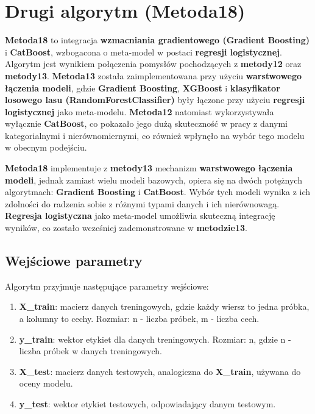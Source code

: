 \section{Drugi algorytm (\textbf{Metoda18})}
\textbf{Metoda18} to integracja \textbf{wzmacniania gradientowego (Gradient Boosting)} i \textbf{CatBoost}, wzbogacona o meta-model w postaci \textbf{regresji logistycznej}. Algorytm jest wynikiem połączenia pomysłów pochodzących z \textbf{metody12} oraz \textbf{metody13}. \textbf{Metoda13} została zaimplementowana przy użyciu \textbf{warstwowego łączenia modeli}, gdzie \textbf{Gradient Boosting}, \textbf{XGBoost} i \textbf{klasyfikator losowego lasu (RandomForestClassifier)} były łączone przy użyciu \textbf{regresji logistycznej} jako meta-modelu. \textbf{Metoda12} natomiast wykorzystywała wyłącznie \textbf{CatBoost}, co pokazało jego dużą skuteczność w pracy z danymi kategorialnymi i nierównomiernymi, co również wpłynęło na wybór tego modelu w obecnym podejściu.

\textbf{Metoda18} implementuje z \textbf{metody13} mechanizm \textbf{warstwowego łączenia modeli}, jednak zamiast wielu modeli bazowych, opiera się na dwóch potężnych algorytmach: \textbf{Gradient Boosting} i \textbf{CatBoost}. Wybór tych modeli wynika z ich zdolności do radzenia sobie z różnymi typami danych i ich nierównowagą. \textbf{Regresja logistyczna} jako meta-model umożliwia skuteczną integrację wyników, co zostało wcześniej zademonstrowane w \textbf{metodzie13}.

\subsection{Wejściowe parametry}
Algorytm przyjmuje następujące parametry wejściowe:

\begin{enumerate}
	\def\labelenumi{\arabic{enumi}.}
	\item
	      \textbf{X\_train}: macierz danych treningowych, gdzie każdy wiersz to jedna próbka, a kolumny to cechy. Rozmiar: n - liczba próbek, m - liczba cech.
	\item
	      \textbf{y\_train}: wektor etykiet dla danych treningowych. Rozmiar: n, gdzie n - liczba próbek w danych treningowych.
	\item
	      \textbf{X\_test}: macierz danych testowych, analogiczna do \textbf{X\_train}, używana do oceny modelu.
	\item
	      \textbf{y\_test}: wektor etykiet testowych, odpowiadający danym testowym.
\end{enumerate}

